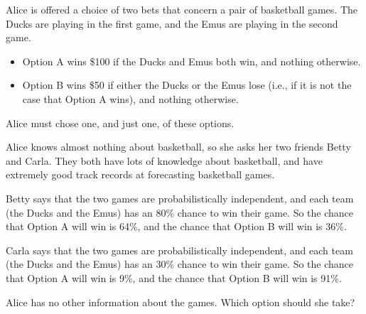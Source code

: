 Alice is offered a choice of two bets that concern a pair of basketball games. The Ducks are playing in the first game, and the Emus are playing in the second game.

\begin{itemize}
\item Option A wins \$100 if the Ducks and Emus both win, and nothing otherwise.
\item Option B wins \$50 if either the Ducks or the Emus lose (i.e., if it is not the case that Option A wins), and nothing otherwise.
\end{itemize}
Alice must chose one, and just one, of these options.

Alice knows almost nothing about basketball, so she asks her two friends Betty and Carla. They both have lots of knowledge about basketball, and have extremely good track records at forecasting basketball games.

Betty says that the two games are probabilistically independent, and each team (the Ducks and the Emus) has an 80\% chance to win their game. So the chance that Option A will win is 64\%, and the chance that Option B will win is 36\%.

Carla says that the two games are probabilistically independent, and each team (the Ducks and the Emus) has an 30\% chance to win their game. So the chance that Option A will win is 9\%, and the chance that Option B will win is 91\%.

Alice has no other information about the games. Which option should she take?


